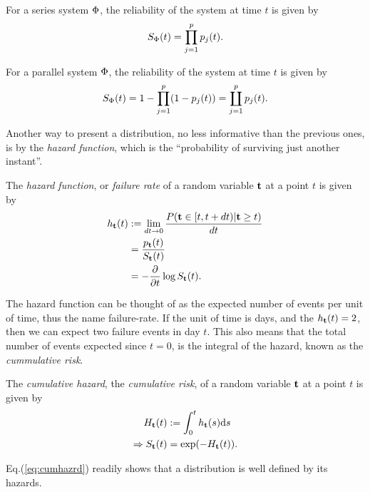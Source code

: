 \begin{example}
For a series system $\Phi$, the reliability of the system at time $t$ is given by $$S_{\Phi} (t)=\prod_{j=1}^{p} p_j(t).$$
\end{example}


\begin{example}
For a parallel system $\Phi$, the reliability of the system at time $t$ is given by $$S_{\Phi} (t)=1- \prod_{j=1}^{p} (1-p_j(t))= \coprod_{j=1}^p p_j(t).$$
\end{example}





Another way to present a distribution, no less informative than the previous ones, is by the \emph{hazard function}, which is the ``probability of surviving just another instant''.
\begin{definition}
The \emph{hazard function}, or \emph{failure rate} of a random variable $\mathbf{t}$ at a point $t$ is given by 
\begin{align}
	h_{\mathbf{t}} (t) &:= \lim_{dt\to 0}\frac{P( \mathbf{t} \in [t,t+dt)|\mathbf{t} \geq t )}{dt} \label{eq:hazard}\\
	&= \frac{p_{\mathbf{t}} (t)}{S_{\mathbf{t}} (t)} \\
	&= - \frac{\partial}{\partial t}\log S_{\mathbf{t}} (t) . \label{eq:survival_to_hazard}
\end{align}
\end{definition}
The hazard function can be thought of as the expected number of events per unit of time, thus the name failure-rate. 
If the unit of time is days, and the $h_{\mathbf{t}} (t)=2$, then we can expect two failure events in day $t$. 
This also means that the total number of events expected since $t=0$, is the integral of the hazard, known as the \emph{cummulative risk}.
\begin{definition}
The \emph{cumulative hazard}, \aka the \emph{cumulative risk}, of a random variable $\mathbf{t}$ at a point $t$ is given by 
\begin{align}
	H_{\mathbf{t}} (t) &:= \int_{0}^{t}h_{\mathbf{t}} (s) \mathrm{d} s \\
	\Rightarrow S_{\mathbf{t}} (t) &= \exp(-H_{\mathbf{t}} (t)). \label{eq:cumhazrd}
\end{align}
\end{definition}
Eq.(\ref{eq:cumhazrd}) readily shows that a distribution is well defined by its hazards.



